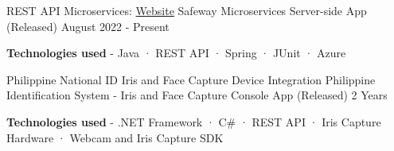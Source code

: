 
\begin{cventries}

  \cventry
    {REST API Microservices: \href{https://www.safeway.com/}{Website}} %
    {Safeway Microservices} %
    {Server-side App (Released)} %
    {August 2022 - Present} %
    {
      \begin{cvitems} %
        \item {\textbf{Technologies used} \hspace{0.03cm} - \hspace{0.03cm} Java \hspace{0.03cm} · \hspace{0.03cm} REST API \hspace{0.03cm} · \hspace{0.03cm} Spring \hspace{0.03cm} · \hspace{0.03cm} JUnit \hspace{0.03cm} · \hspace{0.03cm} Azure \\}
      \end{cvitems}
    }
  \cventry
    {Philippine National ID Iris and Face Capture Device Integration} %
    {Philippine Identification System - Iris and Face Capture} %
    {Console App (Released)} %
    {2 Years} %
    {
      \begin{cvitems} %
        \item {\textbf{Technologies used} \hspace{0.03cm} - \hspace{0.03cm} .NET Framework \hspace{0.03cm} · \hspace{0.03cm} C\# \hspace{0.03cm} · \hspace{0.03cm} REST API \hspace{0.03cm} · \hspace{0.03cm} Iris Capture Hardware \hspace{0.03cm} · \hspace{0.03cm} Webcam and Iris Capture SDK \\}

\end{cvitems}}
\end{cventries}
